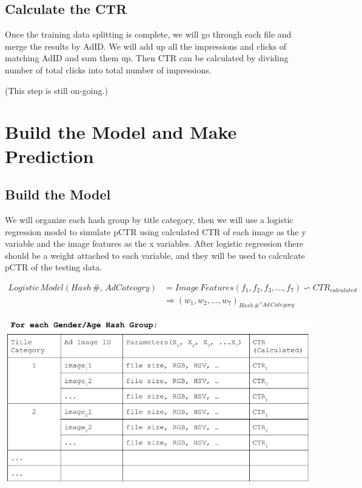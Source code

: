 \documentclass{article} %
\begin{document}
\subsection{Calculate the CTR}
Once the training data splitting is complete, we will go through each file and merge the results by AdID. We will add up all the impressions and clicks of matching AdID and sum them up. Then CTR can be calculated by dividing number of total clicks into total number of impressions. 

(This step is still on-going.)

\section{Build the Model and Make Prediction}
\subsection{Build the Model}
We will organize each hash group by title category, then we will use a logistic regression model to simulate pCTR using calculated CTR of each image as the y variable and the image features as the x variables. After logistic regression there should be a weight attached to each variable, and they will be used to calculcate pCTR of the testing data. 
\begin{center}
\begin{equation}
\begin{split}Logistic\,Model (Hash \,\#, \,Ad Cateogry)& = Image \,Features(f_1, f_2, f_3, ..., f_7) \backsim CTR_{calculated} \\&  \Rightarrow (w_1, w_2, ...,w_7)_{Hash \,\#}, _{Ad \,Category}
\end{split}
\end{equation}
\end{center}

\includegraphics[scale=0.66]{Hash_Group_Model.png}
\end{document}
